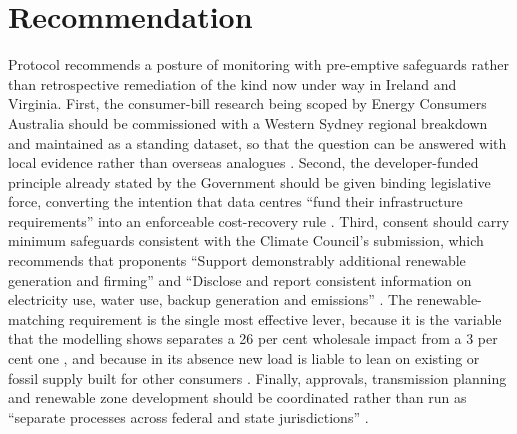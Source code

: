 \section{Recommendation}
\label{sec:supp:gen:rec}

Protocol recommends a posture of monitoring with pre-emptive safeguards rather than retrospective remediation of the kind now under way in Ireland and Virginia. First, the consumer-bill research being scoped by Energy Consumers Australia should be commissioned with a Western Sydney regional breakdown and maintained as a standing dataset, so that the question can be answered with local evidence rather than overseas analogues \autocite{ecaConsumerImpactsDataCentres2025}. Second, the developer-funded principle already stated by the Government should be given binding legislative force, converting the intention that data centres \enquote{fund their infrastructure requirements} into an enforceable cost-recovery rule \autocite{inswDataCentreConsultation2026}. Third, consent should carry minimum safeguards consistent with the Climate Council's submission, which recommends that proponents \enquote{Support demonstrably additional renewable generation and firming} and \enquote{Disclose and report consistent information on electricity use, water use, backup generation and emissions} \autocite{climateCouncilNSWDataCentres2026}. The renewable-matching requirement is the single most effective lever, because it is the variable that the modelling shows separates a 26 per cent wholesale impact from a 3 per cent one \autocite{cefcBaringaDataCentres2025}, and because in its absence new load is liable to lean on existing or fossil supply built for other consumers \autocite{greenpeaceEnergyVampires2026}. Finally, approvals, transmission planning and renewable zone development should be coordinated rather than run as \enquote{separate processes across federal and state jurisdictions} \autocite{usscPoweringCloud2025}.
